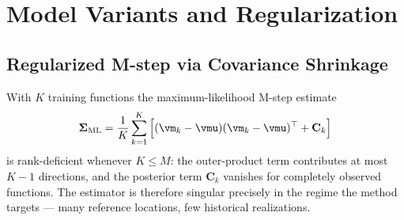 %
%
%
%
%

\section{Model Variants and Regularization}
\label{apd:variants}

\subsection{Regularized M-step via Covariance Shrinkage}
\label{apd:shrinkage}

With $K$ training functions the maximum-likelihood M-step estimate
\begin{equation}
\label{eq:sigma_ml}
    \boldsymbol{\Sigma}_{\text{ML}}
    = \frac{1}{K}\sum_{k=1}^{K}\Big[
        (\vm_k - \vmu)(\vm_k - \vmu)^\top + \mathbf{C}_k \Big]
\end{equation}
is rank-deficient whenever $K \le M$: the outer-product term contributes at most
$K-1$ directions, and the posterior term $\mathbf{C}_k$ vanishes for completely
observed functions. The estimator is therefore singular precisely in the regime
the method targets --- many reference locations, few historical realizations.

